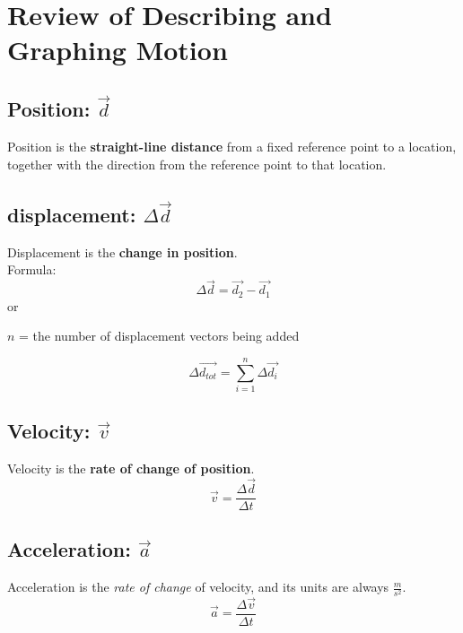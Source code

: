 \section{Review of Describing and Graphing Motion}
\subsection{Position: $\vec{d}$}
Position is the \textbf{straight-line distance} from a fixed reference point to a location, together with the direction from the reference point to that location.

\subsection{displacement: $\Delta\vec{d}$}
Displacement is the \textbf{change in position}.\\
Formula:\\
\[
	\Delta\vec{d} = \vec{d_{2}} - \vec{d_{1}}
\] 
or \\
\begin{center}
    $n$ = the number of displacement vectors being added
\end{center}
\[
	\Delta\vec{d_{tot}} =  \sum_{i = 1}^{n} \Delta\vec{d_{i}}
\]

\subsection{Velocity: $\vec{v}$}
Velocity is the \textbf{rate of change of position}.
\[
	\vec{v} = \frac{\Delta\vec{d}}{\Delta t}
\]

\subsection{Acceleration: $\vec{a}$}
Acceleration is the \textit{rate of change} of velocity, and its units are always $\frac{m}{s^2}$.
\[
\vec{a} = \frac{\Delta \vec{v}}{\Delta t}
\]

